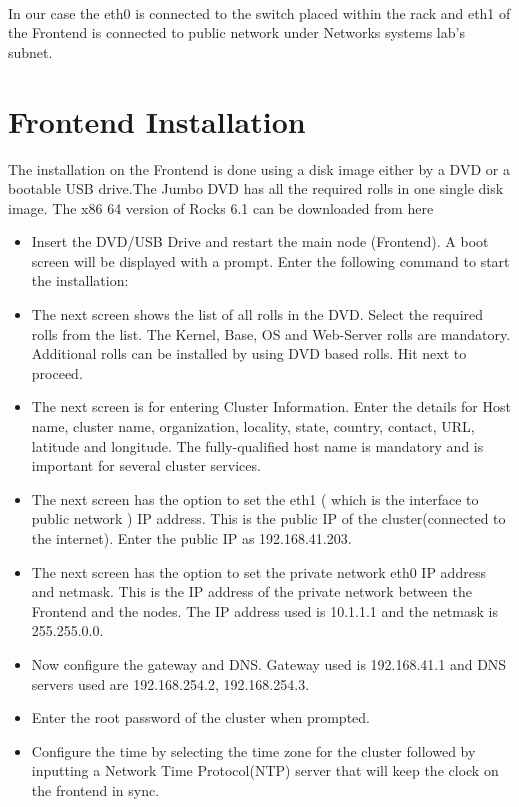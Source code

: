 \paragraph{}
In our case the eth0 is connected to the switch placed within the rack and eth1 of the Frontend is connected to public network under Networks systems lab’s subnet.

\section{Frontend Installation}
The installation on the Frontend is done using a disk image either by a DVD or a bootable USB drive.The Jumbo DVD has all the required rolls in one single disk image. The x86 64 version of Rocks 6.1 can be downloaded from here \cite{rocksdownload}

\begin{itemize}
\item Insert the DVD/USB Drive and restart the main node (Frontend). A boot screen will be displayed with a prompt. Enter the following command to start the installation: 
 \item The next screen shows the list of all rolls in the DVD. Select the required rolls from the list. The Kernel, Base, OS and Web-Server rolls are mandatory. Additional rolls can be installed by using DVD based rolls. Hit next to proceed.
\item The next screen is for entering Cluster Information. Enter the details for Host name, cluster name, organization, locality, state, country, contact, URL, latitude and longitude. The fully-qualified host name is mandatory and is important for several cluster services.
 \item The next screen has the option to set the eth1 ( which is the interface to public network ) IP address. This is the public IP of the cluster(connected to the internet). Enter the public IP as 192.168.41.203.
 
\item The next screen has the option to set the private network eth0 IP address and netmask. This is the IP address of the private network between the Frontend and the nodes. The IP address used is 10.1.1.1 and the netmask is 255.255.0.0.

\item Now configure the gateway and DNS. Gateway used is 192.168.41.1 and DNS servers used are 192.168.254.2, 192.168.254.3.

\item Enter the root password of the cluster when prompted.
\item Configure the time by selecting the time zone for the cluster followed by inputting a Network Time Protocol(NTP) server that will keep the clock on the frontend in sync.


\end{itemize}
